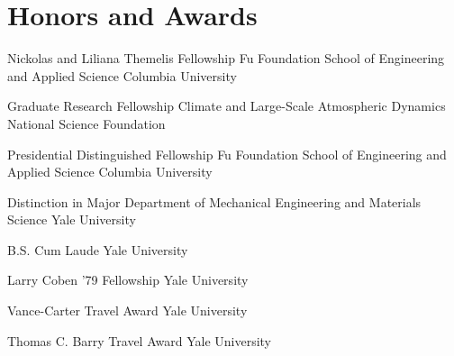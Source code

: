 \section{Honors and Awards}

{Nickolas and Liliana Themelis Fellowship}
{Fu Foundation School of Engineering and Applied Science}
{Columbia University}
{}
{}

{Graduate Research Fellowship}
{Climate and Large-Scale Atmospheric Dynamics}
{National Science Foundation}
{}
{}

{Presidential Distinguished Fellowship}
{Fu Foundation School of Engineering and Applied Science}
{Columbia University}
{}
{}

{Distinction in Major}
{Department of Mechanical Engineering and Materials Science}
{Yale University}
{}
{}

{B.S. Cum Laude}
{}
{Yale University}
{}
{}

{Larry Coben '79 Fellowship}
{}
{Yale University}
{}
{}

{Vance-Carter Travel Award}
{}
{Yale University}
{}
{}

{Thomas C. Barry Travel Award}
{}
{Yale University}
{}
{}
